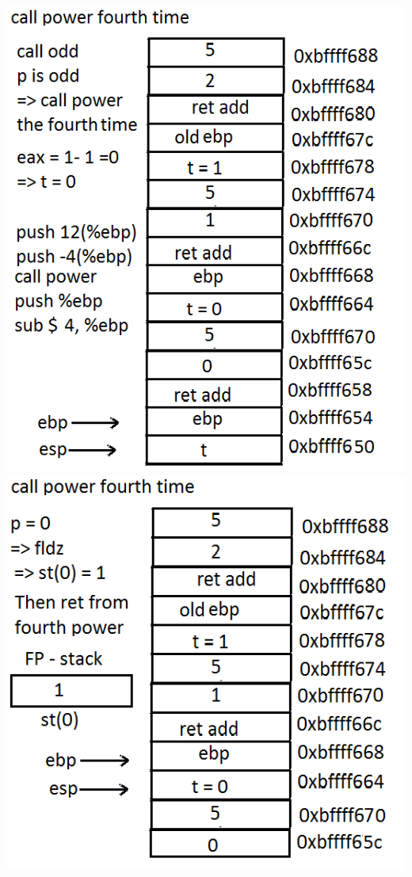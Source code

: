 \documentclass{article}
\begin{document}
\includegraphics[scale=0.5]{stack12.png}\\
\includegraphics[scale=0.5]{stack13.png}
\end{document}
